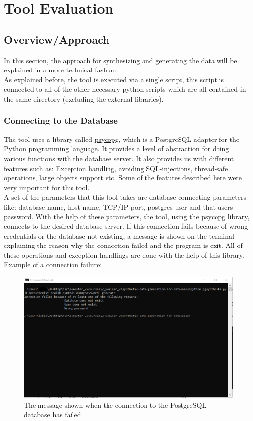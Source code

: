 \chapter{Tool Evaluation}
\label{ch:tool_evaluation}
\section{Overview/Approach}
In this section, the approach for synthesizing and generating the data will be explained in a more technical fashion.\\
As explained before, the tool is executed via a single script, this script is connected to all of the other necessary python scripts which are all contained in the same directory (excluding the external libraries).
\subsection{Connecting to the Database}
The tool uses a library called \href{https://www.psycopg.org/}{psycopg}, which is a PostgreSQL adapter for the Python programming language. It provides a level of abstraction for doing various functions with the database server. It also provides us with different features such as: Exception handling, avoiding SQL-injections, thread-safe operations, large objects support etc. Some of the features described here were very important for this tool.\\
\newline
A set of the parameters that this tool takes are database connecting parameters like: database name, host name, TCP/IP port, postgres user and that users password. With the help of these parameters, the tool, using the psycopg library, connects to the desired database server. If this connection fails because of wrong credentials or the database not existing, a message is shown on the terminal explaining the reason why the connection failed and the program is exit. All of these operations and exception handlings are done with the help of this library.\\
\newpage
Example of a connection failure:
\begin{figure}[H]
	\includegraphics[width=\linewidth]{./Figures/ToolEvaluation/connection_failure_message.png}
	\caption{The message shown when the connection to the PostgreSQL database has failed}
\end{figure}
